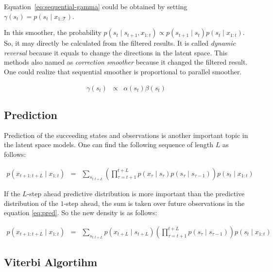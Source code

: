Equation~\ref{eq:sequential-gamma} could be obtained by setting $\gamma(s_t) = p(s_t \mid x_{1:\mathcal{T}})$.

In this smoother, the probability $p\left(s_{t} \mid s_{t+1} , x_{1 : t}\right) \propto p\left(s_{t+1}\mid s_t\right)p\left(s_t\mid x_{1:t}\right)$. 
So, it may directly be calculated from the filtered results. It is called {\it dynamic reversal} because it equals to change the directions in the latent space. 
This methods also named as {\it correction smoother} because it changed the filtered result. 
One could realize that sequential smoother is proportional to parallel smoother. 

\begin{eqnarray}
    \gamma \left(s_t\right) & \propto & \alpha \left(s_t\right) \beta \left(s_t\right)
\end{eqnarray}

\subsection{Prediction}

Prediction of the succeeding states and observations is another important topic in the latent space models. One can find the following sequence of length $L$ as follows:

\begin{eqnarray}
    p\left(x_{t+1:t+L} \mid x_{1 : t}\right) & = & \sum_{s_{t:t+L}} \left(\prod_{\tau=t+1}^{t+L} p\left(x_{\tau} \mid s_{\tau}\right) p\left(s_{\tau} \mid s_{\tau-1}\right)\right) p\left(s_{t} \mid x_{1 : t}\right) \label{eq:pred}
\end{eqnarray}

If the $L$-step ahead predictive distribution is more important than the predictive distribution of the $1$-step ahead, the sum is taken over future observations in the equation \ref{eq:pred}. So the new density is as follows:

\begin{eqnarray}
    p\left(x_{t+1:t+L} \mid x_{1 : t}\right) & = & \sum_{s_{t:t+L}} p\left(x_{t+L} \mid s_{t+L}\right)\left(\prod_{\tau=t+1}^{t+L} p\left(s_{\tau} \mid s_{\tau-1}\right)\right) p\left(s_{t} \mid x_{1 : t}\right)
\end{eqnarray}

\subsection{Viterbi Algortihm}

